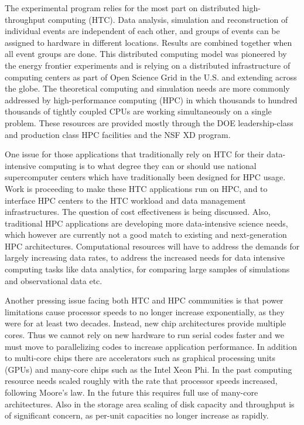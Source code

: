 The experimental program relies for the most part on distributed
high-throughput computing (HTC). Data analysis, simulation and
reconstruction of individual events are independent of each other, and
groups of events can be assigned to hardware in different locations.
Results are combined together when all event groups are done. This
distributed computing model was pioneered by the energy frontier
experiments and is relying on a distributed infrastructure of computing
centers as part of Open Science Grid in the U.S. and extending across the
globe. The theoretical computing and simulation needs are more commonly
addressed by high-performance computing (HPC) in which thousands to hundred
thousands of tightly coupled CPUs are working simultaneously on a single
problem. These resources are provided mostly through the DOE
leadership-class and production class HPC facilities and the NSF XD program.

One issue for those applications that traditionally rely on HTC for their
data-intensive computing is to what degree they can or should use national
supercomputer centers which have traditionally been designed for HPC usage.
Work is proceeding to make these HTC applications run on HPC, and to
interface HPC centers to the HTC workload and data management
infrastructures. The question of cost effectiveness is being discussed.
Also, traditional HPC applications are developing more data-intensive
science needs, which however are currently not a good match to existing and
next-generation HPC architectures. Computational resources will have to
address the demands for largely increasing data rates, to address the
increased needs for data intensive computing tasks like data analytics, for
comparing large samples of simulations and observational data etc.

Another pressing issue facing both HTC and HPC communities is that power
limitations cause processor speeds to no longer increase exponentially, as
they were for at least two decades. Instead, new chip architectures provide
multiple cores. Thus we cannot rely on new hardware to run serial codes
faster and we must move to parallelizing codes to increase application
performance. In addition to multi-core chips there are accelerators such as
graphical processing units (GPUs) and many-core chips such as the Intel
Xeon Phi. In the past computing resource needs scaled roughly with the rate
that processor speeds increased, following Moore’s law. In the future this
requires full use of many-core architectures. Also in the storage area
scaling of disk capacity and throughput is of significant concern, as
per-unit capacities no longer increase as rapidly.

